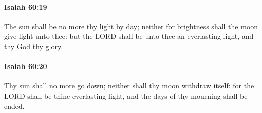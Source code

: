 		\paragraph{Isaiah 60:19} %
			\label{ISAIAH-60-19}

			The sun shall be no more thy light by day; neither for brightness shall the moon give light unto thee: but the LORD shall be unto thee an everlasting light, and thy God thy glory.


		\paragraph{Isaiah 60:20} %
			\label{ISAIAH-60-20}

			Thy sun shall no more go down; neither shall thy moon withdraw itself: for the LORD shall be thine everlasting light, and the days of thy mourning shall be ended.


